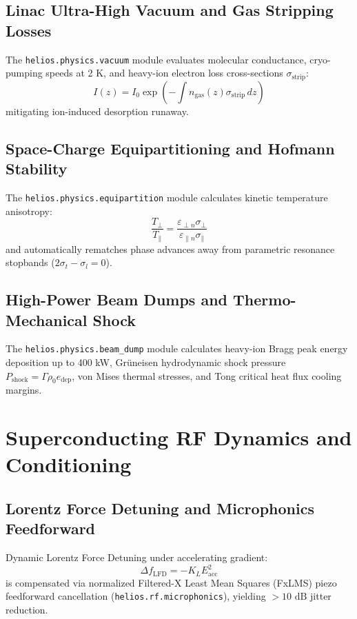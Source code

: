 \documentclass[11pt,a4paper]{report}
\begin{document}
\section{Linac Ultra-High Vacuum and Gas Stripping Losses}
The \texttt{helios.physics.vacuum} module evaluates molecular conductance, cryo-pumping speeds at 2 K, and heavy-ion electron loss cross-sections $\sigma_{\text{strip}}$:
\begin{equation}
    I(z) = I_0 \exp\left( -\int n_{\text{gas}}(z) \sigma_{\text{strip}} \, dz \right)
\end{equation}
mitigating ion-induced desorption runaway.

\section{Space-Charge Equipartitioning and Hofmann Stability}
The \texttt{helios.physics.equipartition} module calculates kinetic temperature anisotropy:
\begin{equation}
    \frac{T_\perp}{T_\parallel} = \frac{\varepsilon_{\perp n} \sigma_\perp}{\varepsilon_{\parallel n} \sigma_\parallel}
\end{equation}
and automatically rematches phase advances away from parametric resonance stopbands ($2\sigma_t - \sigma_l = 0$).

\section{High-Power Beam Dumps and Thermo-Mechanical Shock}
The \texttt{helios.physics.beam\_dump} module calculates heavy-ion Bragg peak energy deposition up to 400 kW, Grüneisen hydrodynamic shock pressure $P_{\text{shock}} = \Gamma \rho_0 e_{\text{dep}}$, von Mises thermal stresses, and Tong critical heat flux cooling margins.

\chapter{Superconducting RF Dynamics and Conditioning}

\section{Lorentz Force Detuning and Microphonics Feedforward}
Dynamic Lorentz Force Detuning under accelerating gradient:
\begin{equation}
    \Delta f_{\text{LFD}} = -K_L E_{\text{acc}}^2
\end{equation}
is compensated via normalized Filtered-X Least Mean Squares (FxLMS) piezo feedforward cancellation (\texttt{helios.rf.microphonics}), yielding $>10\text{ dB}$ jitter reduction.
\end{document}
